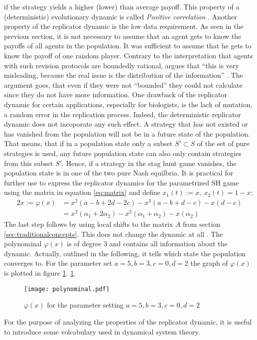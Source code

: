 \documentclass[11pt]{article}
\begin{document}
if the strategy yields a higher (lower) than average payoff. 
This property of a (deterministic) evolutionary dynamic is called 
\textit{Positive correlation} \parencite{sandholm_population_2010}. 
Another property of the replicator dynamic is the low data requirement. As 
seen in the previous section, it is not necessary to assume that an agent
gets to know the payoffs of all agents in the population.
It was sufficient to assume that he gets to know the payoff of one random 
player. 
Contrary to the interpretation that agents with such revision protocols 
are boundedly rational, \textcite{gintis_game_2000}  argues 
that ``this is very misleading, because the real issue is the 
distribution of the information'' \parencite[273]{gintis_game_2000}. 
The argument goes, that even if they were not ``bounded'' they 
could not calculate since they do not have more information. 
One drawback of the replicator dynamic for certain applications, especially
for biologists, is the lack of mutation, a random error in the replication 
process.
Indeed, the deterministic replicator dynamic does not incoporate 
any such effect. A strategy that has not existed or has vanished from the 
population will not be in a future state of the population. 
That means, that if in a population state only a 
subset $S' \subset S$ of the 
set of pure strategies is used, any future population state can also only 
contain strategies from this subset $S'$. Hence, if a strategy in 
the stag hunt game vanishes, the population state is in one of the two pure 
Nash equilbria. It is practical for further use to express the replicator 
dynamics for the parametrized SH game using the matrix in equation 
\eqref{eq:matrix} and define $x_1(t) := x,\ x_2(t) = 1-x$:
\begin{alignat}{2}
        \label{eq:replicatorpara}
        \dot{x} := \varphi(x) &= x^2(a-b+2d-2c) - x^3(a-b+d-c) -x(d-c) \\
                              &= x^2(\alpha_1+2\alpha_2) 
        - x^3(\alpha_1+\alpha_2) - x(\alpha_2)
\end{alignat}
The last step follows by using local shifts to the matrix $A$ from section
\ref{sec:traditionalconcepts}. This does not change the dynamic at all 
\parencite[73]{weibull_evolutionary_1997}. The polynominal $\varphi(x)$ is
of degree $3$ and contains all information about the dynamic. Actually, 
outlined in the following, it tells which state the population converges to.
For the parameter set $a=5, b=3, c=0, d=2$ the graph of $\varphi(x)$ is 
plotted in figure \ref{fig:polynominal}. 
\ref{fig:polynominal}.
\begin{figure}[h]
        \centering
        \texttt{[image: polynominal.pdf]}
        \caption[Polynominal of the Replicator Dynamic]{$\varphi(x)$ for the parameter setting $a=5, b=3, c=0, d=2$}
        \label{fig:polynominal}
\end{figure}
For the purpose of analyzing the properties of the replicator dynamic, it is 
useful to introduce some volcabulary used in dynamical system theory. 
\end{document}

